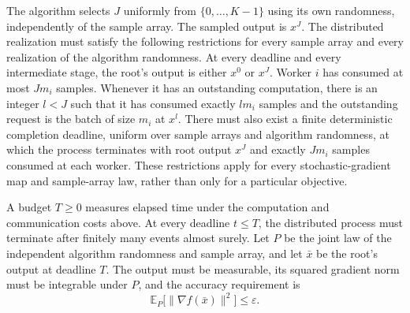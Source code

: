 \documentclass[10pt]{article}
\theoremstyle{definition}
\begin{document}
The algorithm selects $J$ uniformly from $\{0,\ldots,K-1\}$ using its own randomness, independently of the sample array. The sampled output is $x^J$. The distributed realization must satisfy the following restrictions for every sample array and every realization of the algorithm randomness. At every deadline and every intermediate stage, the root's output is either $x^0$ or $x^J$. Worker $i$ has consumed at most $Jm_i$ samples. Whenever it has an outstanding computation, there is an integer $l<J$ such that it has consumed exactly $lm_i$ samples and the outstanding request is the batch of size $m_i$ at $x^l$. There must also exist a finite deterministic completion deadline, uniform over sample arrays and algorithm randomness, at which the process terminates with root output $x^J$ and exactly $Jm_i$ samples consumed at each worker. These restrictions apply for every stochastic-gradient map and sample-array law, rather than only for a particular objective.

A budget $T\geq0$ measures elapsed time under the computation and communication costs above. At every deadline $t\leq T$, the distributed process must terminate after finitely many events almost surely. Let $P$ be the joint law of the independent algorithm randomness and sample array, and let $\bar{x}$ be the root's output at deadline $T$. The output must be measurable, its squared gradient norm must be integrable under $P$, and the accuracy requirement is
\[
\mathbb{E}_{P}\bigl[\|\nabla f(\bar{x})\|^2\bigr]
\leq\varepsilon.
\]
\end{document}
